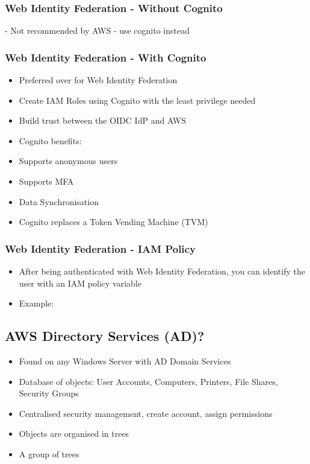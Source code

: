 \subsubsection{Web Identity Federation - Without Cognito}
- Not recommended by AWS - use cognito instead

\subsubsection{Web Identity Federation - With Cognito}
\begin{itemize}
    \item Preferred over for Web Identity Federation
    \item Create IAM Roles using Cognito with the least privilege needed
    \item Build trust between the OIDC IdP and AWS
    \item Cognito benefits:
    \item Supports anonymous users
    \item Supports MFA
    \item Data Synchronisation
    \item Cognito replaces a Token Vending Machine (TVM)
\end{itemize}

\subsubsection{Web Identity Federation - IAM Policy}
\begin{itemize}
    \item After being authenticated with Web Identity Federation, you can identify the user with an IAM policy variable
    \item Example:
\end{itemize}

\subsection{AWS Directory Services (AD)?}
\begin{itemize}
    \item Found on any Windows Server with AD Domain Services
    \item Database of objects: User Accounts, Computers, Printers, File Shares, Security Groups
    \item Centralised security management, create account, assign permissions
    \item Objects are organised in trees
    \item A group of trees
\end{itemize}

